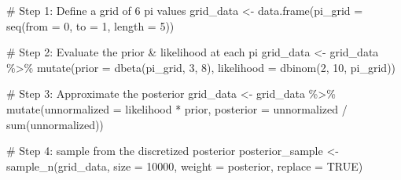 \documentclass[
  letterpaper,
  DIV=11,
  numbers=noendperiod]{scrartcl}
\newenvironment{Shaded}{\begin{snugshade}}{\end{snugshade}}
\newcommand{\AttributeTok}[1]{\textcolor[rgb]{0.40,0.45,0.13}{#1}}
\newcommand{\CommentTok}[1]{\textcolor[rgb]{0.37,0.37,0.37}{#1}}
\newcommand{\ConstantTok}[1]{\textcolor[rgb]{0.56,0.35,0.01}{#1}}
\newcommand{\DecValTok}[1]{\textcolor[rgb]{0.68,0.00,0.00}{#1}}
\newcommand{\FunctionTok}[1]{\textcolor[rgb]{0.28,0.35,0.67}{#1}}
\newcommand{\NormalTok}[1]{\textcolor[rgb]{0.00,0.23,0.31}{#1}}
\newcommand{\OtherTok}[1]{\textcolor[rgb]{0.00,0.23,0.31}{#1}}
\newcommand{\SpecialCharTok}[1]{\textcolor[rgb]{0.37,0.37,0.37}{#1}}
\begin{document}
\begin{Shaded}
\begin{Highlighting}[]
\CommentTok{\# Step 1: Define a grid of 6 pi values}
\NormalTok{grid\_data }\OtherTok{\textless{}{-}} \FunctionTok{data.frame}\NormalTok{(}\AttributeTok{pi\_grid =} \FunctionTok{seq}\NormalTok{(}\AttributeTok{from =} \DecValTok{0}\NormalTok{, }\AttributeTok{to =} \DecValTok{1}\NormalTok{, }
                                      \AttributeTok{length =} \DecValTok{5}\NormalTok{))}

\CommentTok{\# Step 2: Evaluate the prior \& likelihood at each pi}
\NormalTok{grid\_data }\OtherTok{\textless{}{-}}\NormalTok{ grid\_data }\SpecialCharTok{\%\textgreater{}\%} 
  \FunctionTok{mutate}\NormalTok{(}\AttributeTok{prior =} \FunctionTok{dbeta}\NormalTok{(pi\_grid, }\DecValTok{3}\NormalTok{, }\DecValTok{8}\NormalTok{),}
         \AttributeTok{likelihood =} \FunctionTok{dbinom}\NormalTok{(}\DecValTok{2}\NormalTok{, }\DecValTok{10}\NormalTok{, pi\_grid))}

\CommentTok{\# Step 3: Approximate the posterior}
\NormalTok{grid\_data }\OtherTok{\textless{}{-}}\NormalTok{ grid\_data }\SpecialCharTok{\%\textgreater{}\%} 
  \FunctionTok{mutate}\NormalTok{(}\AttributeTok{unnormalized =}\NormalTok{ likelihood }\SpecialCharTok{*}\NormalTok{ prior,}
         \AttributeTok{posterior =}\NormalTok{ unnormalized }\SpecialCharTok{/} \FunctionTok{sum}\NormalTok{(unnormalized))}

\CommentTok{\# Step 4: sample from the discretized posterior}
\NormalTok{posterior\_sample }\OtherTok{\textless{}{-}} \FunctionTok{sample\_n}\NormalTok{(grid\_data, }
                             \AttributeTok{size =} \DecValTok{10000}\NormalTok{, }
                             \AttributeTok{weight =}\NormalTok{ posterior, }
                             \AttributeTok{replace =} \ConstantTok{TRUE}\NormalTok{)}


\end{Highlighting}
\end{Shaded}
\end{document}
